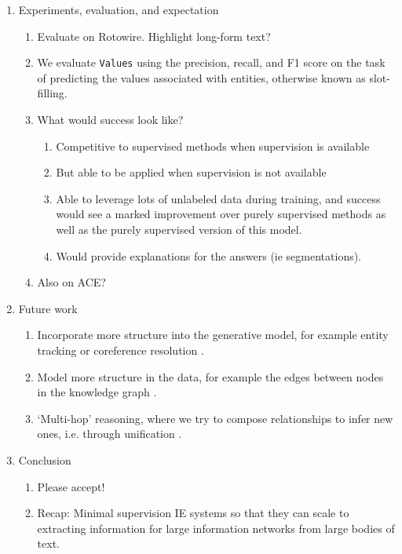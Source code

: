 \documentclass[12pt]{article}
\begin{document}
\begin{enumerate}
\begin{enumerate}
\begin{enumerate}
        \end{enumerate}
    \item Experiments, evaluation, and expectation
        \begin{enumerate}
        \item Evaluate on Rotowire. Highlight long-form text?
        \item We evaluate \texttt{Values} using the precision, recall, and F1 score on the task
            of predicting the values associated with entities, otherwise known as slot-filling.
        \item What would success look like?
            \begin{enumerate}
            \item Competitive to supervised methods when supervision is available
            \item But able to be applied when supervision is not available
            \item Able to leverage lots of unlabeled data during training,
                and success would see a marked improvement over purely supervised methods
                as well as the purely supervised version of this model.
            \item Would provide explanations for the answers (ie segmentations).
            \end{enumerate}
        \item Also on ACE?
        \end{enumerate}
    \item Future work
        \begin{enumerate}
        \item Incorporate more structure into the generative model,
            for example entity tracking or coreference resolution \citet{haghighi2010coref}.
        \item Model more structure in the data, for example the edges between nodes
            in the knowledge graph \citet{chen2018diva}.
        \item `Multi-hop' reasoning, where we try to compose relationships to infer new ones,
            i.e. through unification \citet{chen2018diva,rock17prove}.
        \end{enumerate}
    \item Conclusion
        \begin{enumerate}
        \item Please accept!
        \item Recap: Minimal supervision IE systems so that they can scale to
            extracting information for large information networks from large bodies of text.
        \end{enumerate}
    \end{enumerate}
\end{enumerate}

\newpage


\end{document}
